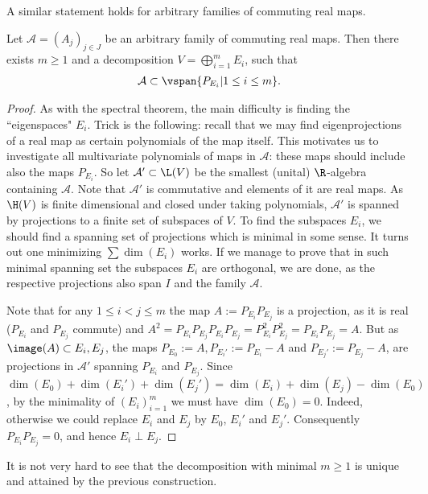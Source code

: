 A similar statement holds for arbitrary families of commuting real maps.

\begin{lause}\label{commuting_real_maps}
	Let $\mathcal{A} = (A_{j})_{j \in J}$ be an arbitrary family of commuting real maps. Then there exists $m \geq 1$ and a decomposition $V = \bigoplus_{i = 1}^{m} E_{i}$, such that
	\begin{align*}
		\mathcal{A} \subset \vspan \{P_{E_{i}} | 1 \leq i \leq m \}.
	\end{align*}
\end{lause}
\begin{proof}
	As with the spectral theorem, the main difficulty is finding the ``eigenspaces" $E_{i}$. Trick is the following: recall that we may find eigenprojections of a real map as certain polynomials of the map itself. This motivates us to investigate all multivariate polynomials of maps in $\mathcal{A}$: these maps should include also the maps $P_{E_{i}}$. So let $\mathcal{A}' \subset \L(V)$ be the smallest (unital) $\R$-algebra containing $\mathcal{A}$. Note that $\mathcal{A}'$ is commutative and elements of it are real maps. As $\H(V)$ is finite dimensional and closed under taking polynomials, $\mathcal{A}'$ is spanned by projections to a finite set of subspaces of $V$. To find the subspaces $E_{i}$, we should find a spanning set of projections which is minimal in some sense. It turns out one minimizing $\sum \dim(E_{i})$ works. If we manage to prove that in such minimal spanning set the subspaces $E_{i}$ are orthogonal, we are done, as the respective projections also span $I$ and the family $\mathcal{A}$.

	Note that for any $1 \leq i < j \leq m$ the map $A := P_{E_{i}} P_{E_{j}}$ is a projection, as it is real ($P_{E_{i}}$ and $P_{E_{j}}$ commute) and $A^{2} = P_{E_{i}} P_{E_{j}} P_{E_{i}} P_{E_{j}} = P_{E_{i}}^2 P_{E_{j}}^2 = P_{E_{i}} P_{E_{j}} = A$. But as $\image(A) \subset E_{i}, E_{j}$, the maps $P_{E_{0}} := A, P_{E_{i}'} := P_{E_{i}} - A$ and $P_{E_{j}'} := P_{E_{j}} - A$, are projections in $\mathcal{A}'$ spanning $P_{E_{i}}$ and $P_{E_{j}}$. Since $\dim(E_{0}) + \dim(E_{i}') + \dim(E_{j}') = \dim(E_{i}) + \dim(E_{j}) - \dim(E_{0})$, by the minimality of $(E_{i})_{i = 1}^{m}$ we must have $\dim(E_{0}) = 0$. Indeed, otherwise we could replace $E_{i}$ and $E_{j}$ by $E_{0}$, $E_{i}'$ and $E_{j}'$. Consequently $P_{E_{i}} P_{E_{j}} = 0$, and hence $E_{i} \perp E_{j}$.
\end{proof}

It is not very hard to see that the decomposition with minimal $m \geq 1$ is unique and attained by the previous construction.

